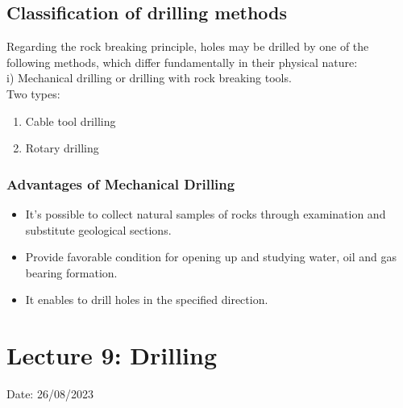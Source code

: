 \documentclass{article}
\begin{document}
\begin{multicols}{2}
  \subsection*{Classification of drilling methods}
  Regarding the rock breaking principle, holes may be drilled by one of the following methods, which differ fundamentally in their physical nature:\\
  
  i) Mechanical drilling or drilling with rock breaking tools.\\

  Two types:\\
  \begin{enumerate}
    \item Cable tool drilling 
    \item Rotary drilling
  \end{enumerate}

  \subsubsection*{Advantages of Mechanical Drilling}
  \begin{itemize}
    \item It's possible to collect natural samples of rocks through examination and substitute geological sections.
    \item Provide favorable condition for opening up and studying water, oil and gas bearing formation.
    \item It enables to drill holes in the specified direction.
  \end{itemize}

\end{multicols}

\vspace{1cm}

\section{Lecture 9: Drilling}
\hfill Date: 26/08/2023
\end{document}
